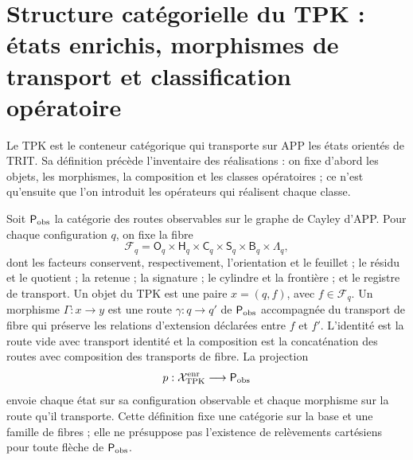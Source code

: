 \section{Structure catégorielle du TPK : états enrichis, morphismes de
transport et classification opératoire}
\label{sec:arbol-operatorio-tpk-rev11}

Le TPK est le conteneur catégorique qui transporte sur APP les états
orientés de TRIT. Sa définition précède l'inventaire des réalisations :
on fixe d'abord les objets, les morphismes, la composition et les classes opératoires ; ce n'est
qu'ensuite que l'on introduit les opérateurs qui réalisent chaque classe.

\begin{definition}
\label{def:estado-enriquecido-tpk-rev11}
Soit \(\mathsf P_{\rm obs}\) la catégorie des routes observables sur le graphe
de Cayley d'APP. Pour chaque configuration \(q\), on fixe la fibre
\[
 \mathcal F_q=
 \mathsf O_q\times\mathsf H_q\times\mathsf C_q\times
 \mathsf S_q\times\mathsf B_q\times\mathsf\Lambda_q,
\]
dont les facteurs conservent, respectivement, l'orientation et le feuillet ; le résidu et le
quotient ; la retenue ; la signature ; le cylindre et la frontière ; et le registre de transport. Un
objet du TPK est une paire \(x=(q,f)\), avec \(f\in\mathcal F_q\). Un morphisme
\(\Gamma:x\to y\) est une route \(\gamma:q\to q'\) de
\(\mathsf P_{\rm obs}\) accompagnée du transport de fibre qui préserve les
relations d'extension déclarées entre \(f\) et \(f'\). L'identité est la
route vide avec transport identité et la composition est la concaténation des
routes avec composition des transports de fibre. La projection
\[
 p:\mathcal X_{\rm TPK}^{\rm enr}\longrightarrow\mathsf P_{\rm obs}
\]
envoie chaque état sur sa configuration observable et chaque morphisme sur la route qu'il
transporte. Cette définition fixe une catégorie sur la base et une famille de
fibres ; elle ne présuppose pas l'existence de relèvements cartésiens pour toute
flèche de \(\mathsf P_{\rm obs}\).
\end{definition}

